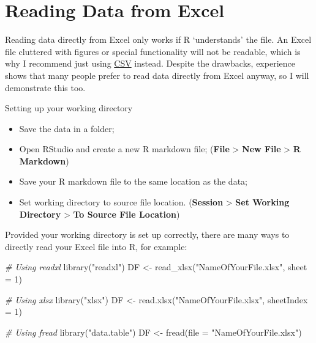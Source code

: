 \documentclass[
]{book}
\newenvironment{Shaded}{\begin{snugshade}}{\end{snugshade}}
\newcommand{\AttributeTok}[1]{\textcolor[rgb]{0.77,0.63,0.00}{#1}}
\newcommand{\CommentTok}[1]{\textcolor[rgb]{0.56,0.35,0.01}{\textit{#1}}}
\newcommand{\DecValTok}[1]{\textcolor[rgb]{0.00,0.00,0.81}{#1}}
\newcommand{\FunctionTok}[1]{\textcolor[rgb]{0.00,0.00,0.00}{#1}}
\newcommand{\NormalTok}[1]{#1}
\newcommand{\OtherTok}[1]{\textcolor[rgb]{0.56,0.35,0.01}{#1}}
\newcommand{\StringTok}[1]{\textcolor[rgb]{0.31,0.60,0.02}{#1}}
\providecommand{\tightlist}{%
  \setlength{\itemsep}{0pt}\setlength{\parskip}{0pt}}
\begin{document}
\hypertarget{Excel}{%
\section{Reading Data from Excel}\label{Excel}}

Reading data directly from Excel only works if R `understands' the file. An Excel file cluttered with figures or special functionality will not be readable, which is why I recommend just using \href{https://youtu.be/BGUqZc-Pb8w}{CSV} instead. Despite the drawbacks, experience shows that many people prefer to read data directly from Excel anyway, so I will demonstrate this too.

Setting up your working directory

\begin{itemize}
\tightlist
\item
  Save the data in a folder;
\item
  Open RStudio and create a new R markdown file; (\textbf{File} \textgreater{} \textbf{New File} \textgreater{} \textbf{R Markdown})
\item
  Save your R markdown file to the same location as the data;
\item
  Set working directory to source file location. (\textbf{Session} \textgreater{} \textbf{Set Working Directory} \textgreater{} \textbf{To Source File Location})
\end{itemize}

Provided your working directory is set up correctly, there are many ways to directly read your Excel file into R, for example:

\begin{Shaded}
\begin{Highlighting}[]
\CommentTok{\# Using readxl}
\FunctionTok{library}\NormalTok{(}\StringTok{"readxl"}\NormalTok{)}
\NormalTok{DF }\OtherTok{\textless{}{-}} \FunctionTok{read\_xlsx}\NormalTok{(}\StringTok{"NameOfYourFile.xlsx"}\NormalTok{, }\AttributeTok{sheet =} \DecValTok{1}\NormalTok{)}

\CommentTok{\# Using xlsx}
\FunctionTok{library}\NormalTok{(}\StringTok{"xlsx"}\NormalTok{)}
\NormalTok{DF }\OtherTok{\textless{}{-}} \FunctionTok{read.xlsx}\NormalTok{(}\StringTok{"NameOfYourFile.xlsx"}\NormalTok{, }\AttributeTok{sheetIndex =} \DecValTok{1}\NormalTok{)}

\CommentTok{\# Using fread}
\FunctionTok{library}\NormalTok{(}\StringTok{"data.table"}\NormalTok{)}
\NormalTok{DF }\OtherTok{\textless{}{-}} \FunctionTok{fread}\NormalTok{(}\AttributeTok{file =} \StringTok{"NameOfYourFile.xlsx"}\NormalTok{)}
\end{Highlighting}
\end{Shaded}
\end{document}
